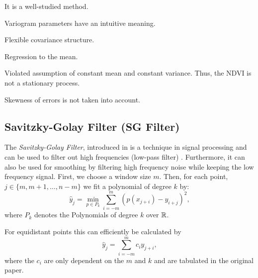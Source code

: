 		\begin{my_pros_cons_table}{
				\item It is a well-studied method.
				\item Variogram parameters have an intuitive meaning.
				\item Flexible covariance structure.
			}{
				\item Regression to the mean.
				\item Violated assumption of constant mean and constant variance. Thus, the NDVI is not a stationary process.
				\item Skewness of errors is not taken into account.
			}
		\end{my_pros_cons_table}


	\subsection{Savitzky-Golay Filter (SG Filter)}
		\label{sec:Savitzky–Golay}
		The \textit{Savitzky-Golay Filter}, introduced in \cite{savitzkySmoothingDifferentiationData1964} is a technique in signal processing and can be used to filter out high frequencies (low-pass filter) \citep{schaferWhatSavitzkyGolayFilter2011}. Furthermore, it can also be used for smoothing by filtering high frequency noise while keeping the low frequency signal.
		First, we choose a window size $m$. Then, for each point, $j \in \{m, m+1, \dots, n-m\}$ we fit a polynomial of degree $k$ by:
		$$\hat y_j=\min_{p\in P_k}\sum_{i=-m}^{m}(p (x_{j+i})-y_{i+j})^{2},$$
		where $P_k$ denotes the Polynomials of degree $k$ over $\mathbb{R}$.

		For equidistant points this can efficiently be calculated by
		$$
			\hat y_{j}=\sum_{i=-m}^{m} c_{i} y_{j+i},
		$$
		where the $c_i$ are only dependent on the $m$ and $k$ and are tabulated in the original paper.

